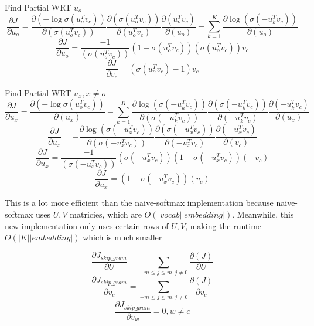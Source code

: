 \documentclass[11pt,largemargins]{homework}
\begin{document}
Find Partial WRT $u_o$ 
$$ \frac{\partial{J}}{\partial{u_o}} = \frac{\partial{(-\log{\sigma{(u_o^T v_c)}})}}{\partial{(\sigma{(u_o^T v_c)})}} \frac{{\partial{(\sigma{(u_o^T v_c)})}}}{\partial{(u_o^T v_c)}}\frac{\partial{(u_o^T v_c)}}{\partial{(u_o)}} - \sum_{k=1}^K \frac{\partial{\log{(\sigma{(-u_k^T v_c)})}}}{\partial{(u_o)}}
$$
$$ \frac{\partial{J}}{\partial{u_o}} = \frac{-1}{(\sigma{(u_o^T v_c)})} (1 - \sigma{(u_o^T v_c)})(\sigma{(u_o^T v_c)})v_c$$
$$ \frac{\partial{J}}{\partial{v_c}} = (\sigma{(u_o^T v_c)} - 1) v_c $$

Find Partial WRT $u_x, x \ne o$ 
$$ \frac{\partial{J}}{\partial{u_x}} = \frac{\partial{(-\log{\sigma{(u_o^T v_c)}})}}{\partial{(u_x)}} - \sum_{k=1}^K \frac{\partial{\log{(\sigma{(-u_k^T v_c)})}}}{\partial{(\sigma{(-u_k^T v_c)})}} \frac{\partial{(\sigma{(-u_k^T v_c)})}} {\partial{(-u_k^T v_c)}} \frac{\partial{(-u_k^T v_c)}}{\partial{(u_x)}}$$
$$ \frac{\partial{J}}{\partial{u_x}} = - \frac{\partial{\log{(\sigma{(-u_x^T v_c)})}}}{\partial{(\sigma{(-u_x^T v_c)})}} \frac{\partial{(\sigma{(-u_x^T v_c)})}} {\partial{(-u_x^T v_c)}} \frac{\partial{(-u_x^T v_c)}}{\partial{(v_c)}}$$
$$ \frac{\partial{J}}{\partial{u_x}} = \frac{-1}{(\sigma{(-u_x^T v_c)})} (\sigma{(-u_x^T v_c)})(1-\sigma{(-u_x^T v_c)}) (-v_c)$$
$$ \frac{\partial{J}}{\partial{u_x}} = (1- \sigma{(-u_x^T v_c)}) (v_c)$$


This is a lot more efficient than the naive-softmax implementation because naive-softmax uses $U, V$ matricies, which are $O(|vocab||embedding|)$. Meanwhile, this new implementation only uses certain rows of $U, V$, making the runtime $O(|K||embedding|)$ which is much smaller

\question

$$ \frac{\partial{J_{skip\_gram}}}{\partial{U}} = \sum_{-m \le j \le m, j \ne 0} \frac{\partial{(J)}}{\partial{U}}$$
$$ \frac{\partial{J_{skip\_gram}}}{\partial{v_c}} = \sum_{-m \le j \le m, j \ne 0} \frac{\partial{(J)}}{\partial{v_c}}$$
$$ \frac{\partial{J_{skip\_gram}}}{\partial{v_w}} = 0, w \ne c $$
\end{document}
